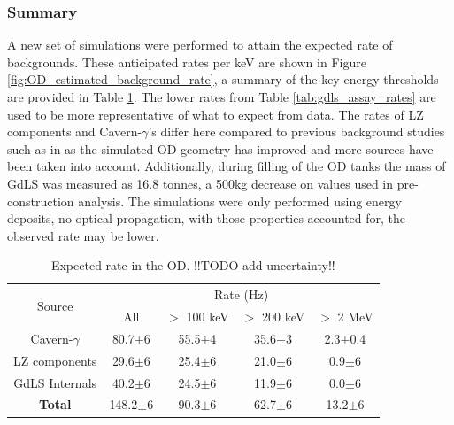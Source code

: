 \subsubsection{Summary}
\par
A new set of simulations were performed to attain the expected rate of backgrounds.
These anticipated rates per keV are shown in Figure \ref{fig:OD_estimated_background_rate}, a summary of the key energy thresholds are provided in Table \ref{tab:od_expected_rates}.
The lower rates from Table \ref{tab:gdls_assay_rates} are used to be more representative of what to expect from data.
The rates of LZ components and Cavern-$\gamma$'s differ here compared to previous background studies such as in \cite{LZ_TechnicalDesignReview_ref,LZ_projected_sensitivity_paper_ref,sallyshaw_thesis_ref,scotthaselschwardt_thesis_ref} as the simulated OD geometry has improved and more sources have been taken into account.
Additionally, during filling of the OD tanks the mass of GdLS was measured as 16.8 tonnes, a 500kg decrease on values used in pre-construction analysis. 
The simulations were only performed using energy deposits, no optical propagation, with those properties accounted for, the observed rate may be lower.

\begin{table}[!htbp]
    \centering
    \begin{tabular}{c|c|c|c|c} %
    \hline
    \multirow{2}{*}{Source} & \multicolumn{4}{c}{Rate (Hz)} \\
                            & All   & $>$ 100 keV & $>$ 200 keV & $>$ 2 MeV \\ \hline
    Cavern-$\gamma$         & 80.7$\pm$6  & 55.5$\pm$4  & 35.6$\pm$3  & 2.3$\pm$0.4     \\
    LZ components           & 29.6$\pm$6  & 25.4$\pm$6  & 21.0$\pm$6  & 0.9$\pm$6       \\
    GdLS Internals          & 40.2$\pm$6  & 24.5$\pm$6  & 11.9$\pm$6  & 0.0$\pm$6       \\ \hline
    \textbf{Total}          & 148.2$\pm$6 & 90.3$\pm$6  & 62.7$\pm$6  & 13.2$\pm$6      \\ \hline
    \end{tabular}
    \caption{Expected rate in the OD. !!TODO add uncertainty!!}
    \label{tab:od_expected_rates}
\end{table} 


